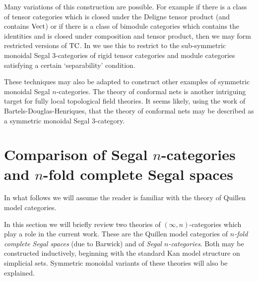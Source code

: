 \documentclass[a4paper]{amsart}
\begin{document}
Many variations of this construction are possible. For example if there is a class of tensor categories which is closed under the Deligne tensor product (and contains $\mathrm{Vect}$) or if there is a class of bimodule categories which contains the identities and is closed under composition and tensor product, then we may form restricted versions of $\mathrm{TC}$. In \cite{DSPS} we use this to restrict to the sub-symmetric monoidal Segal 3-categories of rigid tensor categories and module categories satisfying a certain `separability' condition.    

These techniques may also be adapted to construct other examples of symmetric monoidal Segal $n$-categories. The theory of conformal nets \cite{0912.5307} is another intriguing target for fully local topological field theories. It seems likely, using the work of Bartels-Douglas-Henriques, that the theory of conformal nets may be described as a symmetric monoidal Segal 3-category.  



\appendix


\section{Comparison of Segal $n$-categories and $n$-fold complete Segal spaces} \label{app:compare}




In what follows we will assume the reader is familiar with the theory of Quillen model categories. 

In this section we will briefly review two theories of $(\infty,n)$-categories which play a role in the current work. These are the Quillen model categories of {\em $n$-fold complete Segal spaces} (due to Barwick) and of {\em Segal $n$-categories}. Both may be constructed inductively, beginning with the standard Kan model structure on simplicial sets. Symmetric monoidal variants of these theories will also be explained. 
\end{document}
